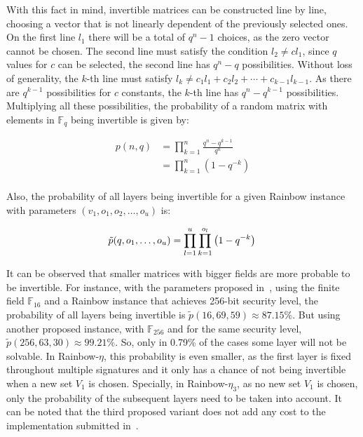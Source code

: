 \documentclass{ufsctex/ufsctex}
\begin{document}
With this fact in mind, invertible matrices can be constructed line by line,
choosing a vector that is not linearly dependent of the previously selected
ones. On the first line $l_1$ there will be a total of $q^n - 1$ choices, as
the zero vector cannot be chosen. The second line must satisfy the condition
$l_2 \neq c l_1$, since $q$ values for $c$ can be selected, the second line has
$q^n - q$ possibilities. Without loss of generality, the $k$-th line must
satisfy $l_k \ne c_1l_1 + c_2l_2 + \cdots + c_{k-1}l_{k-1}$. As there are
$q^{k-1}$ possibilities for $c$ constants, the $k$-th line has $q^n - q^{k-1}$
possibilities. Multiplying all these possibilities, the probability of a random
matrix with elements in $\mathbb{F}_q$ being invertible is given by:

\begin{equation}
\begin{split}
p(n, q) &= \prod_{k=1}^{n} \frac{q^n - q^{k-1}}{q^n} \\
&= \prod_{k=1}^{n} \left( 1 - q^{-k} \right) \\
\end{split}
\end{equation}

Also, the probability of all layers being invertible for a given Rainbow
instance with parameters $(v_1, o_1, o_2, \ldots, o_u)$ is:

\begin{equation}
\tilde{p}(q, o_1, \ldots, o_u) =
	\prod_{l=1}^{u} \prod_{k=1}^{o_l} \left( 1 - q^{-k} \right) \\
\end{equation}

It can be observed that smaller matrices with bigger fields are more probable
to be invertible. For instance, with the parameters proposed in~\cite[Chapter
6]{petzoldt2013thesis}, using the finite field $\mathbb{F}_{16}$ and a Rainbow
instance that achieves 256-bit security level, the probability of all layers
being invertible is $\tilde{p}(16, 69, 59) \approx 87.15\%$. But using another
proposed instance, with $\mathbb{F}_{256}$ and for the same security level,
$\tilde{p}(256, 63, 30) \approx 99.21\%$. So, only in 0.79\% of the cases some
layer will not be solvable. In Rainbow-$\eta$, this probability is even
smaller, as the first layer is fixed throughout multiple signatures and it only
has a chance of not being invertible when a new set $V_1$ is chosen. Specially,
in Rainbow-$\eta_3$, as no new set $V_1$ is chosen, only the probability of the
subsequent layers need to be taken into account. It can be noted that the third
proposed variant does not add any cost to the implementation submitted
in~\cite{ding2017nist}.
\end{document}
